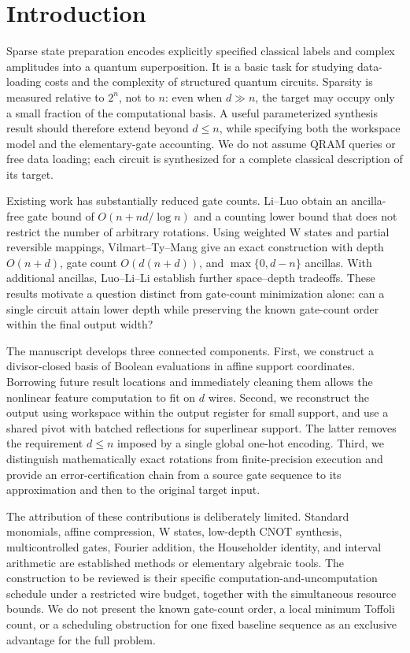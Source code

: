 \section{Introduction}
Sparse state preparation encodes explicitly specified classical labels and complex amplitudes into a quantum superposition. It is a basic task for studying data-loading costs and the complexity of structured quantum circuits. Sparsity is measured relative to $2^n$, not to $n$: even when $d\gg n$, the target may occupy only a small fraction of the computational basis. A useful parameterized synthesis result should therefore extend beyond $d\le n$, while specifying both the workspace model and the elementary-gate accounting. We do not assume QRAM queries or free data loading; each circuit is synthesized for a complete classical description of its target.

Existing work has substantially reduced gate counts. Li--Luo obtain an ancilla-free gate bound of $O(n+nd/\log n)$ and a counting lower bound that does not restrict the number of arbitrary rotations\cite{liluo2025}. Using weighted W states and partial reversible mappings, Vilmart--Ty--Mang give an exact construction with depth $O(n+d)$, gate count $O(d(n+d))$, and $\max\{0,d-n\}$ ancillas\cite{vilmart2026}. With additional ancillas, Luo--Li--Li establish further space--depth tradeoffs\cite{luo2025}. These results motivate a question distinct from gate-count minimization alone: can a single circuit attain lower depth while preserving the known gate-count order within the final output width?

The manuscript develops three connected components. First, we construct a divisor-closed basis of Boolean evaluations in affine support coordinates. Borrowing future result locations and immediately cleaning them allows the nonlinear feature computation to fit on $d$ wires. Second, we reconstruct the output using workspace within the output register for small support, and use a shared pivot with batched reflections for superlinear support. The latter removes the requirement $d\le n$ imposed by a single global one-hot encoding. Third, we distinguish mathematically exact rotations from finite-precision execution and provide an error-certification chain from a source gate sequence to its approximation and then to the original target input.

The attribution of these contributions is deliberately limited. Standard monomials, affine compression, W states, low-depth CNOT synthesis, multicontrolled gates, Fourier addition, the Householder identity, and interval arithmetic are established methods or elementary algebraic tools\cite{jiang2020,nie2024,malvetti2021,draper2000,johansson2016}. The construction to be reviewed is their specific computation-and-uncomputation schedule under a restricted wire budget, together with the simultaneous resource bounds. We do not present the known gate-count order, a local minimum Toffoli count, or a scheduling obstruction for one fixed baseline sequence as an exclusive advantage for the full problem.


